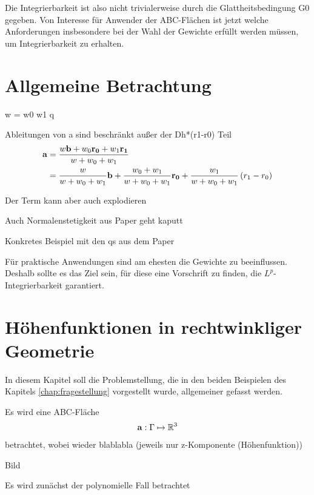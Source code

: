 \documentclass[10pt,a4paper,oneside]{report}
\newcommand{\R}{\mathbb{R}}
\begin{document}
Die Integrierbarkeit ist also nicht trivialerweise durch die Glattheitsbedingung G0 gegeben.
Von Interesse für Anwender der ABC-Flächen ist jetzt welche Anforderungen insbesondere bei der Wahl der Gewichte erfüllt werden müssen, um Integrierbarkeit zu erhalten.

\chapter{Allgemeine Betrachtung}

w = w0 w1 q

Ableitungen von a sind beschränkt außer der Dh*(r1-r0) Teil
\begin{align*}
\bold{a} &= \frac{w\bold{b} + w_0 \bold{r_0}+ w_1 \bold{r_1}}{w + w_0 + w_1} \\
&= \frac{w}{w+w_0+w_1} \bold{b} + \frac{w_0 + w_1}{w+w_0+w_1} \bold{r_0} + \frac{w_1}{w+w_0+w_1} \left(r_1-r_0\right)
\end{align*}


Der Term kann aber auch explodieren

Auch Normalenstetigkeit aus Paper geht kaputt

Konkretes Beispiel mit den qs aus dem Paper

Für praktische Anwendungen sind am ehesten die Gewichte zu beeinflussen.
Deshalb sollte es das Ziel sein, für diese eine Vorschrift zu finden, die $L^p$-Integrierbarkeit garantiert.

\chapter{Höhenfunktionen in rechtwinkliger Geometrie}

In diesem Kapitel soll die Problemstellung, die in den beiden Beispielen des Kapitels \ref{chap:fragestellung} vorgestellt wurde, allgemeiner gefasst werden.

Es wird eine ABC-Fläche 
\begin{align*}
\bold{a}: \Gamma \mapsto \R^3
\end{align*}
betrachtet, wobei wieder blablabla
(jeweils nur z-Komponente (Höhenfunktion))

Bild

Es wird zunächst der polynomielle Fall betrachtet
\end{document}
